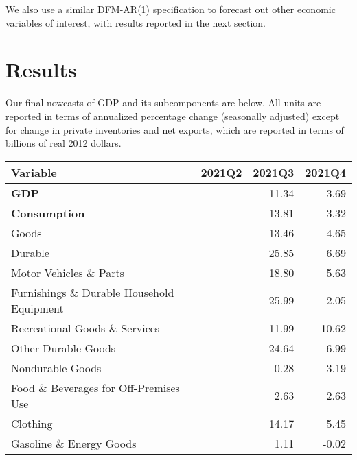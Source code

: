 \documentclass[11pt, letterpaper]{article}\usepackage[]{graphicx}\usepackage[]{color}
\begin{document}
We also use a similar DFM-AR(1) specification to forecast out other economic variables of interest, with results reported in the next section.


\section{Results}
Our final nowcasts of GDP and its subcomponents are below. All units are reported in terms of annualized percentage change (seasonally adjusted) except for change in private inventories and net exports, which are reported in terms of billions of real 2012 dollars.
\begin{table}[H]
\centering
\begingroup\fontsize{10pt}{12pt}\selectfont
\begin{tabular}{lrrr}
  \hline
Variable & 2021Q2 & 2021Q3 & 2021Q4 \\ 
  \hline
\hspace{0mm} \textbf{GDP} &  & 11.34 & 3.69 \\ 
  \hspace{0mm} \textbf{Consumption} &  & 13.81 & 3.32 \\ 
  \hspace{8mm}  Goods &  & 13.46 & 4.65 \\ 
  \hspace{16mm}  Durable &  & 25.85 & 6.69 \\ 
  \hspace{24mm}  Motor Vehicles \& Parts &  & 18.80 & 5.63 \\ 
  \hspace{24mm}  Furnishings \& Durable Household Equipment &  & 25.99 & 2.05 \\ 
  \hspace{24mm}  Recreational Goods \& Services &  & 11.99 & 10.62 \\ 
  \hspace{24mm}  Other Durable Goods &  & 24.64 & 6.99 \\ 
  \hspace{16mm}  Nondurable Goods &  & -0.28 & 3.19 \\ 
  \hspace{24mm}  Food \& Beverages for Off-Premises Use &  & 2.63 & 2.63 \\ 
  \hspace{24mm}  Clothing &  & 14.17 & 5.45 \\ 
  \hspace{24mm}  Gasoline \& Energy Goods &  & 1.11 & -0.02 \\ 

\end{tabular}
\end{table}
\end{document}
